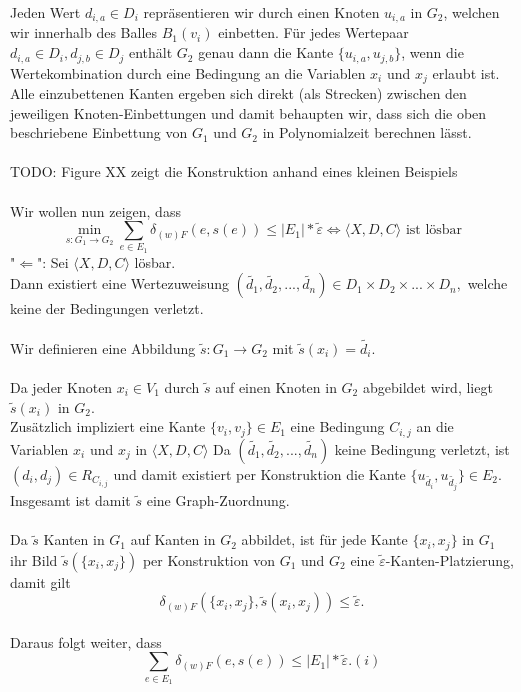 \documentclass[a4paper, 12pt, twoside]{article}
\theoremstyle{Format1} %
\begin{document}
Jeden Wert $d_{i,a} \in D_i$ repräsentieren wir durch einen Knoten $u_{i,a}$ in $G_2$, welchen wir innerhalb des Balles $B_1(v_i)$ einbetten.
Für jedes Wertepaar $d_{i,a} \in D_i, d_{j,b} \in D_j$ enthält $G_2$ genau dann die Kante $\{u_{i,a},u_{j,b}\}$, wenn die Wertekombination
durch eine Bedingung an die Variablen $x_i$ und $x_j$ erlaubt ist.
\\
Alle einzubettenen Kanten ergeben sich direkt (als Strecken) zwischen den jeweiligen Knoten-Einbettungen und
damit behaupten wir, dass sich die oben beschriebene Einbettung von $G_1$ und $G_2$ in Polynomialzeit berechnen lässt.
\\
\\
TODO: Figure XX zeigt die Konstruktion anhand eines kleinen Beispiels
\\
\\
Wir wollen nun zeigen, dass
$$ \min_{s: G_1 \to G_2} \sum_{e \in E_1} \delta_{(w)F}(e, s(e)) \leq |E_1| * \tilde{\varepsilon} \iff \langle X,D,C \rangle \text{ ist lösbar}$$
"$\Leftarrow$":
Sei $\langle X,D,C \rangle$ lösbar.
\\
Dann existiert eine Wertezuweisung $(\tilde{d_1},\tilde{d_2},...,\tilde{d_n}) \in {D_1 \times D_2 \times ... \times D_n},$ welche keine der Bedingungen verletzt.
\\\\
Wir definieren eine Abbildung $\tilde{s}:G_1 \to G_2$ mit $\tilde{s}(x_i) = \tilde{d_i}$.
\\
\\
Da jeder Knoten $x_i \in V_1$ durch $\tilde{s}$ auf einen Knoten in $G_2$ abgebildet wird, liegt $\tilde{s}(x_i)$ in $G_2$.
\\
Zusätzlich impliziert eine Kante $\{v_i, v_j\} \in E_1$ eine Bedingung $C_{i,j}$ an die Variablen $x_i$ und $x_j$ in $\langle X,D,C \rangle$
Da $(\tilde{d_1},\tilde{d_2},...,\tilde{d_n})$ keine Bedingung verletzt, ist $(d_i,d_j) \in R_{C_{i,j}}$ und damit existiert per Konstruktion
die Kante $\{u_{\tilde{d_i}}, u_{\tilde{d_j}}\} \in E_2$.
Insgesamt ist damit $\tilde{s}$ eine Graph-Zuordnung.
\\
\\
Da $\tilde{s}$ Kanten in $G_1$ auf Kanten in $G_2$ abbildet, ist für jede Kante $\{x_i, x_j\}$ in $G_1$ ihr Bild $\tilde{s}(\{x_i,x_j\})$ per Konstruktion
von $G_1$ und $G_2$ eine $\tilde{\varepsilon}$-Kanten-Platzierung, damit gilt
$$\delta_{(w)F}(\{x_i,x_j\}, \tilde{s}({x_i,x_j})) \leq \tilde{\varepsilon}.$$
\\
Daraus folgt weiter, dass $$\sum_{e \in E_1} \delta_{(w)F}(e, s(e)) \leq |E_1| * \tilde{\varepsilon}. (i) $$
\end{document}
